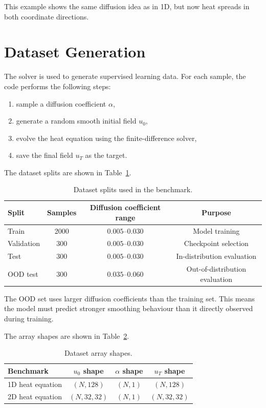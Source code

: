 \documentclass[11pt,a4paper]{article}
\begin{document}
This example shows the same diffusion idea as in 1D, but now heat spreads in both coordinate directions.

\section{Dataset Generation}

The solver is used to generate supervised learning data. For each sample, the code performs the following steps:
\begin{enumerate}[leftmargin=*]
    \item sample a diffusion coefficient \(\alpha\),
    \item generate a random smooth initial field \(u_0\),
    \item evolve the heat equation using the finite-difference solver,
    \item save the final field \(u_T\) as the target.
\end{enumerate}

The dataset splits are shown in Table~\ref{tab:dataset_splits}.

\begin{table}[H]
    \centering
    \caption{Dataset splits used in the benchmark.}
    \label{tab:dataset_splits}
    \begin{tabular}{lccc}
        \toprule
        Split & Samples & Diffusion coefficient range & Purpose \\
        \midrule
        Train & 2000 & \(0.005\)--\(0.030\) & Model training \\
        Validation & 300 & \(0.005\)--\(0.030\) & Checkpoint selection \\
        Test & 300 & \(0.005\)--\(0.030\) & In-distribution evaluation \\
        OOD test & 300 & \(0.035\)--\(0.060\) & Out-of-distribution evaluation \\
        \bottomrule
    \end{tabular}
\end{table}

The OOD set uses larger diffusion coefficients than the training set. This means the model must predict stronger smoothing behaviour than it directly observed during training.

The array shapes are shown in Table~\ref{tab:data_shapes}.

\begin{table}[H]
    \centering
    \caption{Dataset array shapes.}
    \label{tab:data_shapes}
    \begin{tabular}{lccc}
        \toprule
        Benchmark & \(u_0\) shape & \(\alpha\) shape & \(u_T\) shape \\
        \midrule
        1D heat equation & \((N,128)\) & \((N,1)\) & \((N,128)\) \\
        2D heat equation & \((N,32,32)\) & \((N,1)\) & \((N,32,32)\) \\
        \bottomrule
    \end{tabular}
\end{table}
\end{document}

